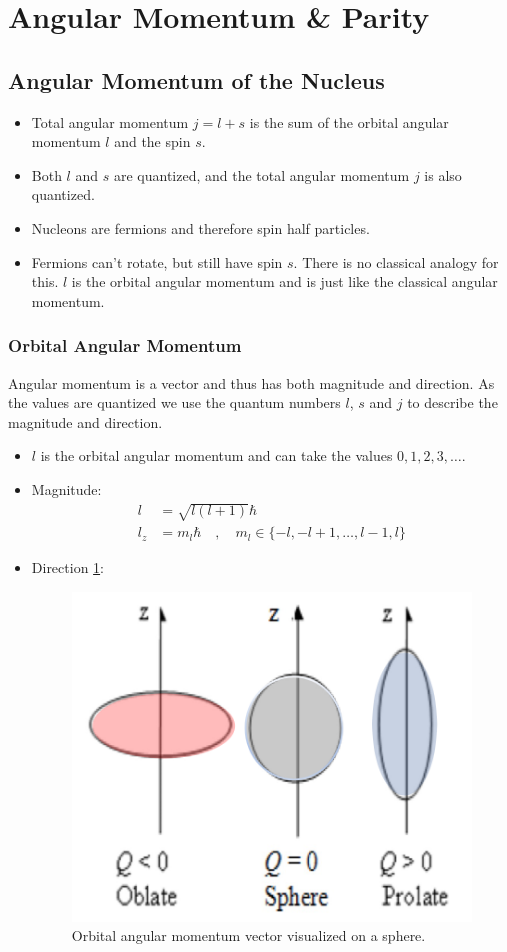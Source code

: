 \section{Angular Momentum \& Parity}
\subsection{Angular Momentum of the Nucleus}
\begin{itemize}
    \item Total angular momentum $j = l + s$ is the sum of the orbital angular momentum $l$ and the spin $s$. 
    \item Both $l$ and $s$ are quantized, and the total angular momentum $j$ is also quantized.
    \item Nucleons are fermions and therefore spin half particles. 
    \item Fermions can't rotate, but still have spin $s$. There is no classical analogy for this. $l$ is the orbital angular momentum and is just like the classical angular momentum.
\end{itemize}
\subsubsection{Orbital Angular Momentum}
Angular momentum is a vector and thus has both magnitude and direction. As the values are quantized we use the quantum numbers $l$, $s$ and $j$ to describe the magnitude and direction. 
\begin{itemize}
    \item $l$ is the orbital angular momentum and can take the values $0, 1, 2, 3, \ldots$.
    \item Magnitude: 
    \begin{align}
    l &= \sqrt{l(l+1)}ℏ \\
    l_z &= m_lℏ \quad , \quad m_l ∈ \{-l, -l+1, \ldots, l-1, l\} 
    \end{align} 
    \item Direction \cref{fig: angular_momentum_sphere}:
    \begin{figure}[h!]
        \centering
        \includegraphics[width = .75\textwidth]{angular_momentum_sphere.png}
        \caption{Orbital angular momentum vector visualized on a sphere.}
        \label{fig: angular_momentum_sphere}
    \end{figure}
\end{itemize}    

